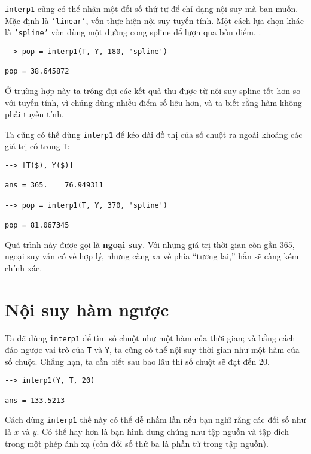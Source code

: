 \documentclass[12pt]{book}
\begin{document}
{\tt interp1} cũng có thể nhận một đối số thứ tư để chỉ dạng nội suy mà bạn muốn.
Mặc định là {\tt 'linear'}, vốn thực hiện nội suy tuyến tính. Một cách lựa chọn khác là
{\tt 'spline'} vốn dùng một đường cong spline để lượn qua bốn điểm, .

\begin{verbatim}
--> pop = interp1(T, Y, 180, 'spline')

pop = 38.645872
\end{verbatim}
%
Ở trường hợp này ta trông đợi các kết quả thu được từ nội suy spline 
tốt hơn so với tuyến tính, vì chúng dùng nhiều điểm số liệu hơn, 
và ta biết rằng hàm không phải tuyến tính.

Ta cũng có thể dùng  {\tt interp1} để kéo dài đồ thị của số chuột ra 
ngoài khoảng các giá trị có trong {\tt T}:

\begin{verbatim}
--> [T($), Y($)]

ans = 365.    76.949311

--> pop = interp1(T, Y, 370, 'spline')

pop = 81.067345
\end{verbatim}
%
Quá trình này được gọi là  {\bf ngoại suy}.  Với những giá trị thời gian 
còn gần 365, ngoại suy vẫn có vẻ hợp lý, nhưng càng xa về phía 
``tương lai,'' hẳn sẽ càng kém chính xác. 

%
%


\section{Nội suy hàm ngược}

Ta đã dùng {\tt interp1} để tìm số chuột như một hàm của thời gian;
và bằng cách đảo ngược vai trò của {\tt T} và {\tt Y},  ta cũng có thể 
nội suy thời gian như một hàm của số chuột. Chẳng hạn, ta cần biết 
sau bao lâu thì số chuột sẽ đạt đến 20.

\begin{verbatim}
--> interp1(Y, T, 20)

ans = 133.5213
\end{verbatim}
%
Cách dùng {\tt interp1} thế này có thể dễ nhầm lẫn nếu bạn nghĩ rằng 
các đối số như là $x$ và $y$. Có thể hay hơn là bạn hình dung chúng 
như tập nguồn và tập đích trong một phép ánh xạ (còn đối số thứ ba 
là phần tử trong tập nguồn).
\end{document}
